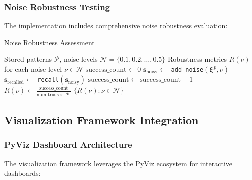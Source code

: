 \documentclass[11pt,a4paper]{article}
\begin{document}
\subsubsection{Noise Robustness Testing}

The implementation includes comprehensive noise robustness evaluation:

\begin{algorithm}[H]
\caption{Noise Robustness Assessment}
\begin{algorithmic}[1]
\REQUIRE Stored patterns $\mathcal{P}$, noise levels $\mathcal{N} = \{0.1, 0.2, \ldots, 0.5\}$
\ENSURE Robustness metrics $R(\nu)$ for each noise level $\nu \in \mathcal{N}$
    \STATE $\text{success\_count} \leftarrow 0$
            \STATE $\mathbf{s}_{\text{noisy}} \leftarrow $ \texttt{add\_noise}$(\boldsymbol{\xi}^p, \nu)$
            \STATE $\mathbf{s}_{\text{recalled}} \leftarrow $ \texttt{recall}$(\mathbf{s}_{\text{noisy}})$
                \STATE $\text{success\_count} \leftarrow \text{success\_count} + 1$
            \ENDIF
        \ENDFOR
    \ENDFOR
    \STATE $R(\nu) \leftarrow \frac{\text{success\_count}}{\text{num\_trials} \times |\mathcal{P}|}$
\ENDFOR
\RETURN $\{R(\nu) : \nu \in \mathcal{N}\}$
\end{algorithmic}
\end{algorithm}

\subsection{Visualization Framework Integration}

\subsubsection{PyViz Dashboard Architecture}

The visualization framework leverages the PyViz ecosystem for interactive dashboards:
\end{document}
